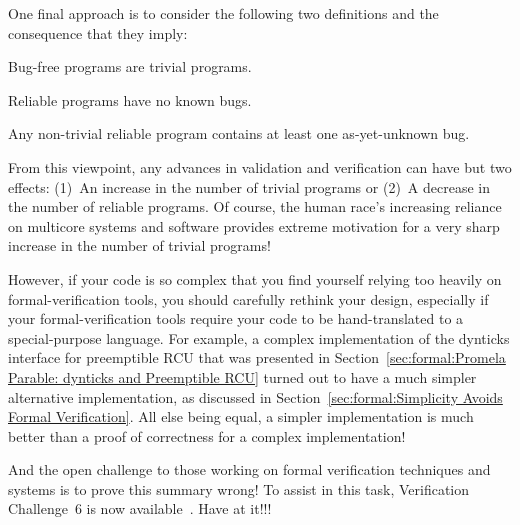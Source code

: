 One final approach is to consider the following two definitions and the
consequence that they imply:

\begin{description}[itemsep=0pt,labelindent=1em]
\item[Definition:]	Bug-free programs are trivial programs.
\item[Definition:]	Reliable programs have no known bugs.
\item[Consequence:]	Any non-trivial reliable program contains at least
			one as-yet-unknown bug.
\end{description}

From this viewpoint, any advances in validation and verification can
have but two effects: (1)~An increase in the number of trivial programs or
(2)~A decrease in the number of reliable programs.
Of course, the human race's increasing reliance on multicore systems and
software provides extreme motivation for a very sharp increase in the
number of trivial programs!

However, if your code is so complex that you find yourself
relying too heavily on formal-verification
tools, you should carefully rethink your design, especially if your
formal-verification tools require your code to be hand-translated
to a special-purpose language.
For example, a complex implementation of the dynticks interface for
preemptible RCU that was presented in
Section~\ref{sec:formal:Promela Parable: dynticks and Preemptible RCU}
turned out to
have a much simpler alternative implementation, as discussed in
Section~\ref{sec:formal:Simplicity Avoids Formal Verification}.
All else being equal, a simpler implementation is much better than
a proof of correctness for a complex implementation!

And the open challenge to those working on formal verification techniques
and systems is to prove this summary wrong!
To assist in this task, Verification Challenge~6 is now
available~\cite{PaulEMcKenney2017VerificationChallenge6}.
Have at it!!!
